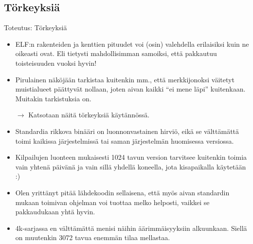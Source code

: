 \documentclass[pdf,10pt,handout]{beamer}
\begin{document}
\subsection{Törkeyksiä}
\begin{frame}{Toteutus: Törkeyksiä}
  \begin{itemize}
    \item ELF:n rakenteiden ja kenttien pituudet voi (osin) valehdella
      erilaisiksi kuin ne oikeasti ovat. Eli tietysti mahdollisimman
      samoiksi, että pakkautuu toisteisuuden vuoksi hyvin!
    \item Pirulainen näköjään tarkistaa kuitenkin mm., että
      merkkijonoksi väitetyt muistialueet päättyvät nollaan, joten
      aivan kaikki ``ei mene läpi'' kuitenkaan. Muitakin tarkistuksia
      on.
    \item[$\rightarrow$] Katsotaan näitä törkeyksiä käytännössä.
    \item Standardia rikkova binääri on luonnonvastainen hirviö, eikä
      se välttämättä toimi kaikissa järjestelmissä tai saman
      järjestelmän huomisessa versiossa.
    \item Kilpailujen luonteen mukaisesti 1024 tavun version tarvitsee
      kuitenkin toimia vain yhtenä päivänä ja vain sillä yhdellä
      koneella, jota kisapaikalla käytetään :)
    \item Olen yrittänyt pitää lähdekoodin sellaisena, että myös aivan
      standardin mukaan toimivan ohjelman voi tuottaa melko helposti,
      vaikkei se pakkaudukaan yhtä hyvin.
    \item 4k-sarjassa en välttämättä menisi näihin äärimmäisyyksiin
      alkuunkaan. Siellä on muutenkin 3072 tavua enemmän tilaa
      mellastaa.
  \end{itemize}
\end{frame}
\end{document}
